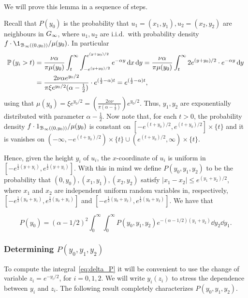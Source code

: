 We will prove this lemma in a sequence of steps.

Recall that $P(y_0)$ is the probability that $u_1 = (x_1,y_1), u_2 = (x_2,y_2)$ are neighbours in $G_{\infty}$, where
$u_1, u_2$ are i.i.d.~with probability density $f \cdot \1_{\BallPo{(0,y_0)}} / \mu(y_0)$.
In particular
\begin{align*}
	\mathbb{P}\left(y_i > t\right) &= \frac{\nu\alpha}{\pi \mu(y_0)} \int_t^\infty \int_{-e^{(y+y_0)/2}}^{e^{(y+y_0)/2}} e^{-\alpha y}
		\operatorname{\mathrm{d}\hspace{-2pt}} x \operatorname{\mathrm{d}\hspace{-2pt}} y
		= \frac{\nu\alpha}{\pi \mu(y_0)} \int_t^\infty 2 e^{(y+y_0)/2} \cdot e^{-\alpha y} \operatorname{\mathrm{d}\hspace{-2pt}} y \\
	&= \frac{2 \nu\alpha e^{y_0/2} }{\pi \xi e^{y_0/2} (\alpha-\frac{1}{2}) }  \cdot e^{(\frac{1}{2}-\alpha)t}
		= e^{(\frac{1}{2}-\alpha)t},
\end{align*}
using that $\mu(y_0) = \xi e^{y_0/2} = \left(\frac{2\alpha\nu}{\pi(\alpha-\frac12)}\right) e^{y_0/2}$.
Thus, $y_1, y_2$ are exponentially distributed with parameter $\alpha-\frac12$.
Now note that, for each $t>0$, the probability density $f \cdot 1_{{\mathcal B}_{\infty}\left((0,y_0)\right)} / \mu(y_0)$
is constant on $[-e^{(t+y_0)/2}, e^{(t+y_0)/2}] \times \{t\}$ and it is 
vanishes on $(-\infty, -e^{(t+y_0)/2}) \times \{t\} \cup (e^{(t+y_0)/2},\infty)\times\{t\}$.

Hence, given the height $y_i$ of $u_i$, the $x$-coordinate of $u_i$ is uniform in $[-e^{\frac{1}{2}(y+y_i)},e^{\frac{1}{2}(y+y_i)}]$. 
With this in mind we define $P(y_0,y_1,y_2)$ to be the probability that $(0,y_0), (x_1,y_1), (x_2,y_2)$ 
satisfy $|x_1-x_2| \leq e^{(y_1+y_2)/2}$, where $x_1$ and $x_2$ are independent uniform random variables in, respectively, 
$[-e^{\frac{1}{2}(y_0+y_1)},e^{\frac{1}{2}(y_0+y_1)}]$ and  $[-e^{\frac{1}{2}(y_0+y_2)},e^{\frac{1}{2}(y_0+y_2)}]$.
We have that

\begin{equation}\label{eq:delta_P}
 P(y_0) = (\alpha-1/2)^2 \int_0^\infty \int_0^\infty P(y_0, y_1, y_2) e^{-(\alpha-1/2)(y_1+y_2)} 
 \dd y_2 \dd y_1.
\end{equation}

\subsubsection{Determining $P(y_0,y_1,y_2)$}


To compute the integral~\eqref{eq:delta_P} it will be convenient to use the 
change of variable $z_i = e^{-y_i/2}$, for $i= 0, 1, 2$. 
We will write $y_i(z_i)$ to stress the dependence between $y_i$ and $z_i$. 
The following result completely characterizes $P(y_0,y_1,y_2)$.

